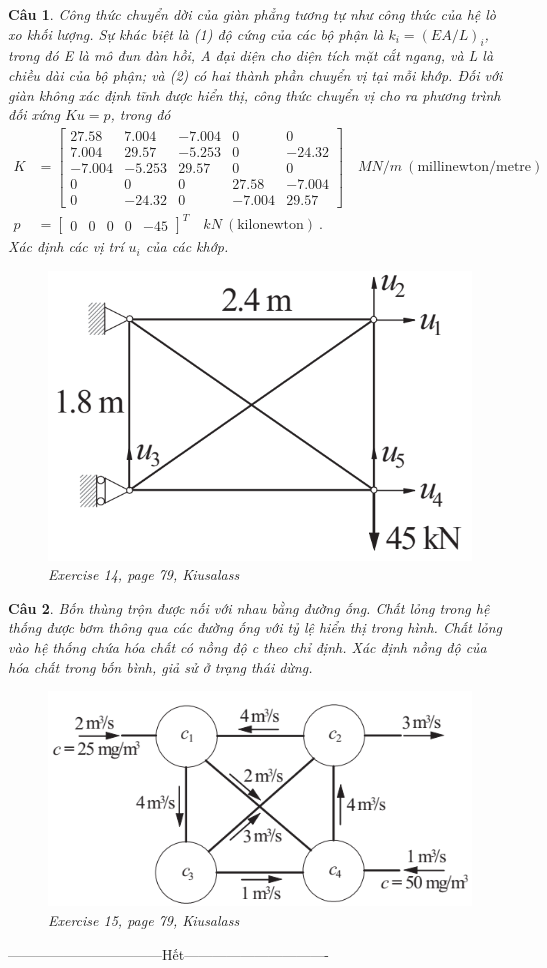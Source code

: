 \documentclass[11pt]{article}
\newtheorem{bt}{Câu}
\newcommand{\m}[1]{\begin{bmatrix}
		#1
\end{bmatrix}}
\begin{document}
\begin{bt}
Công thức chuyển dời của giàn phẳng tương tự như công thức của hệ lò xo khối lượng. Sự khác biệt là (1) độ cứng của các bộ phận là $k_i = (EA / L)_i$, trong đó E là mô đun đàn hồi, A đại diện cho diện tích mặt cắt ngang, và L là chiều dài của bộ phận; và (2) có hai thành phần chuyển vị tại mỗi khớp. Đối với giàn không xác định tĩnh được hiển thị, công thức chuyển vị cho ra phương trình đối xứng $Ku = p$, trong đó
\begin{align*}
K &=
\m{	27.58 & 7.004 &-7.004 &0 &0 \\
	7.004 &29.57& -5.253& 0 &-24.32 \\
	-7.004 &-5.253 &29.57& 0& 0 \\
	0& 0& 0& 27.58& -7.004 \\
	0& -24.32& 0 &-7.004& 29.57} \quad MN/m \ (\mbox{millinewton/metre}) \\
p &= \m{0 &0& 0& 0& -45}^T \quad kN \ (\mbox{kilonewton}) \ .
\end{align*}
Xác định các vị trí $u_i$ của các khớp.

\begin{figure}[h!]
	\centering
	\includegraphics[width=0.5\linewidth]{plane_truss}
	\caption{Exercise 14, page 79, Kiusalass}
	\label{fig:planetruss}
\end{figure}
\end{bt}

\newpage 

\begin{bt}
Bốn thùng trộn được nối với nhau bằng đường ống. Chất lỏng trong hệ thống được bơm thông qua các đường ống với tỷ lệ hiển thị trong hình. Chất lỏng vào hệ thống
chứa hóa chất có nồng độ c theo chỉ định. Xác định nồng độ của hóa chất trong bốn bình, giả sử ở trạng thái dừng.
\begin{figure}[h!]
	\centering
	\includegraphics[width=0.5\linewidth]{mixing_tank}
	\caption{Exercise 15, page 79, Kiusalass}
	\label{fig:mixingtank}
\end{figure}
\end{bt}

\centerline{———————————Hết——————————-}
\end{document}

